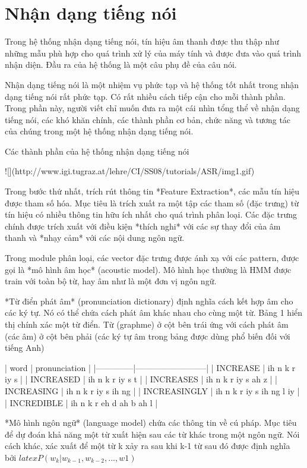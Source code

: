 \chapter{Nhận dạng tiếng nói}

Trong hệ thống nhận dạng tiếng nói, tín hiệu âm thanh được thu thập như những mẫu phù hợp cho quá trình xử lý của máy tính và được đưa vào quá trình nhận diện. Đầu ra của hệ thống là một câu phụ đề của câu nói.

Nhận dạng tiếng nói là một nhiệm vụ phức tạp và hệ thống tốt nhất trong nhận dạng tiếng nói rất phức tạp. Có rất nhiều cách tiếp cận cho mỗi thành phần. Trong phần này, người viết chỉ muốn đưa ra một cái nhìn tổng thể về nhận dạng tiếng nói, các khó khăn chính, các thành phần cơ bản, chức năng và tương tác của chúng trong một hệ thống nhận dạng tiếng nói.

Các thành phần của hệ thống nhận dạng tiếng nói

![](http://www.igi.tugraz.at/lehre/CI/SS08/tutorials/ASR/img1.gif)

Trong bước thứ nhất, trích rút thông tin *Feature Extraction*, các mẫu tín hiệu được tham số hóa. Mục tiêu là trích xuất ra một tập các tham số (đặc trưng) từ tín hiệu có nhiều thông tin hữu ích nhất cho quá trình phân loại.  Các đặc trưng chính được trích xuất với điều kiện *thích nghi* với các sự thay đổi của âm thanh và *nhạy cảm* với các nội dung ngôn ngữ.

Trong module phân loại, các vector đặc trưng được ánh xạ với các pattern, được gọi là *mô hình âm học* (acoustic model). Mô hình học thường là HMM được train với toàn bộ từ, hay âm như là một đơn vị ngôn ngữ.

*Từ điển phát âm* (pronunciation dictionary) định nghĩa cách kết hợp âm cho các ký tự. Nó có thể chứa cách phát âm khác nhau cho cùng một từ. Bảng 1 hiển thị chính xác một từ điển. Từ (graphme) ở cột bên trái ứng với cách phát âm (các âm) ở cột bên phải (các ký tự âm trong bảng được dùng phổ biến đối với tiếng Anh)

| word         | pronunciation            |
|--------------|--------------------------|
| INCREASE     | ih n k r iy s            |
| INCREASED    | ih n k r iy s t          |
| INCREASES    | ih n k r iy s ah z       |
| INCREASING   | ih n k r iy s ih ng      |
| INCREASINGLY | ih n k r iy s ih ng l iy |
| INCREDIBLE   | ih n k r eh d ah b ah l  |

*Mô hình ngôn ngữ* (language model) chứa các thông tin về cú pháp. Mục tiêu để dự đoán khả năng một từ xuất hiện sau các từ khác trong một ngôn ngữ. Nói cách khác, xác xuất để một từ k xảy ra sau khi k-1 từ sau đó được định nghĩa bởi $latex P(w_k | w_{k-1}, w_{k-2}, ..., w1)$

